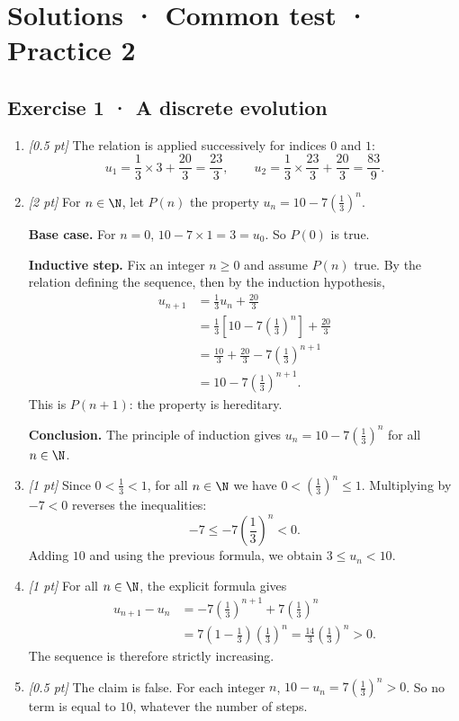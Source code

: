 \ifmxteacher\mxnewpage

\section*{Solutions · Common test · Practice 2}\label{cor:3-2}

\subsection*{Exercise 1 · A discrete evolution}\begin{enumerate}

\item \textit{[0.5 pt]} The relation is applied successively for indices $0$ and $1$:\[u_1=\frac{1}{3}\times 3+\frac{20}{3}=\frac{23}{3},\qquad u_2=\frac{1}{3}\times \frac{23}{3}+\frac{20}{3}=\frac{83}{9}.\]

\item \textit{[2 pt]} For $n\in\N$, let $P(n)$ the property $u_n=10-7\left(\frac{1}{3}\right)^n$.
\par\smallskip\textbf{Base case.} For $n=0$, $10-7\times1=3=u_0$. So $P(0)$ is true.
\par\smallskip\textbf{Inductive step.} Fix an integer $n\ge0$ and assume $P(n)$ true. By the relation defining the sequence, then by the induction hypothesis,
\[\begin{aligned}u_{n+1}&=\frac{1}{3}u_n+\frac{20}{3}\\
&=\frac{1}{3}\left[10-7\left(\frac{1}{3}\right)^n\right]+\frac{20}{3}\\
&=\frac{10}{3}+\frac{20}{3}-7\left(\frac{1}{3}\right)^{n+1}\\
&=10-7\left(\frac{1}{3}\right)^{n+1}.
\end{aligned}\]
This is $P(n+1)$: the property is hereditary.
\par\smallskip\textbf{Conclusion.} The principle of induction gives $u_n=10-7\left(\frac{1}{3}\right)^n$ for all $n\in\N$.

\item \textit{[1 pt]} Since $0<\frac{1}{3}<1$, for all $n\in\N$ we have $0<(\frac{1}{3})^n\le1$. Multiplying by $-7<0$ reverses the inequalities:
\[-7\le-7(\frac{1}{3})^n<0.\]
Adding $10$ and using the previous formula, we obtain $3\le u_n<10$.

\item \textit{[1 pt]} For all $n\in\N$, the explicit formula gives
\[\begin{aligned}u_{n+1}-u_n&=-7(\frac{1}{3})^{n+1}+7(\frac{1}{3})^n\\&=7(1-\frac{1}{3})(\frac{1}{3})^n=\frac{14}{3}(\frac{1}{3})^n>0.\end{aligned}\]
The sequence is therefore strictly increasing.

\item \textit{[0.5 pt]} The claim is false. For each integer $n$, $10-u_n=7(\frac{1}{3})^n>0$. So no term is equal to $10$, whatever the number of steps.

\end{enumerate}

